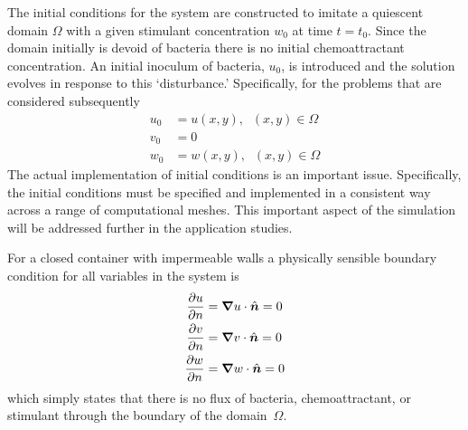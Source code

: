 The initial conditions for the system are constructed to imitate a quiescent domain $\Omega$ with a given stimulant concentration $w_0$ at time $t=t_0$.  Since the domain initially is devoid of bacteria there is no initial chemoattractant concentration.  An initial inoculum of bacteria, $u_0$, is introduced and the solution evolves in response to this `disturbance.'  Specifically, for the problems that are considered subsequently
\begin{align}
  \label{eq:u0_bio}
  u_0 &= u(x,y), \;\; (x,y) \in \Omega \\
  \label{eq:v0_bio}
  v_0 &= 0 \\
  \label{eq:w0_bio}
  w_0 &= w(x,y), \;\; (x,y) \in \Omega
\end{align}
The actual implementation of initial conditions is an important issue.  Specifically, the initial conditions must be specified and implemented in a consistent way across a range of computational meshes.  This important aspect of the simulation will be addressed further in the application studies.

For a closed container with impermeable walls a physically sensible boundary condition for all variables in the system is 
\begin{align}
  \label{eq:du_dn_bio_eq_0}
  {\frac{\partial{u}}{\partial{n}}} &= {\boldsymbol{\nabla}} {u}\cdot\hat{{\boldsymbol{n}}} = 0 \\
  \label{eq:dv_dn_bio_eq_0}
  {\frac{\partial{v}}{\partial{n}}} &= {\boldsymbol{\nabla}} {v}\cdot\hat{{\boldsymbol{n}}} = 0 \\
  \label{eq:dw_dn_bio_eq_0}
  {\frac{\partial{w}}{\partial{n}}} &= {\boldsymbol{\nabla}} {w}\cdot\hat{{\boldsymbol{n}}} = 0
\end{align}
which simply states that there is no flux of bacteria, chemoattractant, or stimulant through the boundary of the domain~$\Omega$. %



